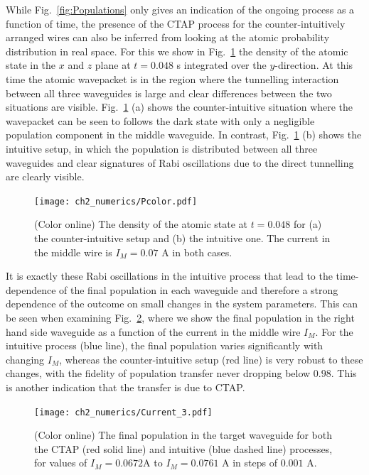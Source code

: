While Fig.~\ref{fig:Populations} only gives an indication of the ongoing process as a function of time, the presence of the CTAP process for the counter-intuitively arranged wires can also be inferred from looking at the atomic probability distribution in real space. For this we show in Fig.~\ref{fig:Pcolor}  the density of the atomic state in the $x$ and $z$ plane at $t=0.048$ s integrated over the $y$-direction. At this time the atomic wavepacket is in the region where the tunnelling interaction between all three waveguides is large and clear differences between the two situations are visible. Fig.~\ref{fig:Pcolor} (a) shows the counter-intuitive situation where the wavepacket can be seen to follows the dark state with only a negligible population component in the middle waveguide. In contrast, Fig.~\ref{fig:Pcolor} (b) shows the intuitive setup, in which the population is distributed between all three waveguides and clear signatures of Rabi oscillations due to the direct tunnelling are clearly visible.

\begin{figure}[tb]
  \texttt{[image: ch2\_numerics/Pcolor.pdf]}
  \caption{(Color online) The density of the atomic state at $t=0.048$ for (a) the counter-intuitive setup and (b) the intuitive one. The current in the middle wire is $I_M=0.07$ A in both cases.}
  \label{fig:Pcolor}
\end{figure}

It is exactly these Rabi oscillations in the intuitive process that lead to the time-dependence of the final population in each waveguide and therefore a strong dependence of the outcome on small changes in the system parameters. This can be seen when examining Fig.~\ref{fig:Current}, where we show the final population in the right hand side waveguide as a function of the current in the middle wire $I_M$. For the intuitive process (blue line), the final population varies significantly with changing $I_M$, whereas the counter-intuitive setup (red line) is very robust to these changes, with the fidelity of population transfer never dropping below $0.98$. This is another indication that the transfer is due to CTAP.

\begin{figure}[tbh]
  \texttt{[image: ch2\_numerics/Current\_3.pdf]}
  \caption{(Color online) The final population in the  target waveguide for both the CTAP (red solid line) and intuitive (blue dashed line) processes, for values of $I_M=0.0672$A to $I_M=0.0761$ A in steps of $0.001$ A.}
  \label{fig:Current}
\end{figure}

